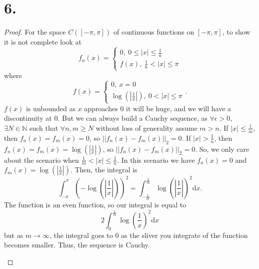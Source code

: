 \documentclass{article}
\begin{document}
\section*{6.}
\begin{proof}
  For the space $C([-\pi, \pi])$ of continuous functions on $[-\pi, \pi]$, to show it is not complete look at 
  \[
  f_n(x) = \begin{cases}
    0, \ 0 \leq |x| \leq \frac{1}{n}\\
    f(x), \ \frac{1}{n} < |x| \leq \pi
  \end{cases}  
  \]
  where 
  \[
  f(x) = \begin{cases}
    0, \ x = 0 \\
    \log\left(\left|\frac{1}{x} \right|\right), \ 0 < |x| \leq \pi
  \end{cases}.
  \]
$f(x)$ is unbounded as $x$ approaches $0$ it will be huge, and we will have a discontinuity at $0$. But we can always build a Cauchy sequence, as
$\forall \epsilon > 0$, $\exists N \in \mathbb{N}$ such that $\forall n, m \geq N$ without loss of generality assume $m > n$. If $|x| \leq \frac{1}{m}$, then $f_n(x) = f_m(x) = 0$, so $||f_n(x) - f_m(x)||_2 = 0$. If $|x| > \frac{1}{n}$, then $f_n(x) = f_m(x) = \log\left(\left|\frac{1}{x}\right|\right)$, so $||f_n(x) - f_m(x)||_2 = 0$. So, we only care about the scenario when $\frac{1}{m} < |x| \leq \frac{1}{n}$. In this scenario we have $f_n(x) = 0$ and $f_m(x) = \log\left(\left|\frac{1}{x}\right|\right)$. Then, the integral is 
\[
 \int_{-\pi}^{\pi}\left(-\log\left(\left|\frac{1}{x}\right|\right)\right)^2 = \int_{-\frac{1}{m}}^{\frac{1}{m}} \log\left(\left|\frac{1}{x}\right|\right)^2 \mathrm{d}x.
\]
The function is an even function, so our integral is equal to 
\[
 2 \int_0^{\frac{1}{m}}\log(\frac{1}{x})^2 \mathrm{d}x
\]
but as $m \to \infty$, the integral goes to $0$ as the sliver you integrate of the function becomes smaller. Thus, the sequence is Cauchy. 
\begin{center}

\end{center}
\end{proof}
\end{document}
